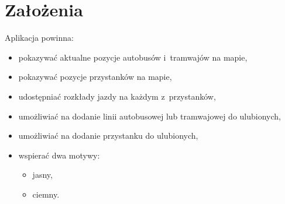 \documentclass{SGGW-thesis}
\begin{document}
\section{Założenia}
Aplikacja powinna:
\label{ZALOZENIA}
\begin{itemize}
  \item{pokazywać aktualne pozycje autobusów i~tramwajów na mapie,}
  \item{pokazywać pozycje przystanków na mapie,}
  \item{udostępniać rozkłady jazdy na każdym z~przystanków,}
  \item{umożliwiać na dodanie linii autobusowej lub tramwajowej do ulubionych,}
  \item{umożliwiać na dodanie przystanku do ulubionych,}
  \item{wspierać dwa motywy:}
  \begin{itemize}
    \item{jasny,}
    \item{ciemny.}
  \end{itemize}
\end{itemize}
\vfill
\pagebreak
\end{document}
